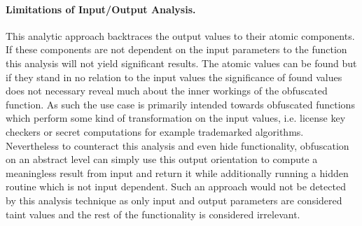 \documentclass[10pt,twoside,a4paper,bibliography=totoc]{scrbook}
\begin{document}
\paragraph*{Limitations of Input/Output Analysis.} This analytic approach backtraces the output values to their atomic components. 
If these components are not dependent on the input parameters to the function this analysis will not yield significant results.
The atomic values can be found but if they stand in no relation to the input values the significance of found values does not necessary reveal much about the inner workings of the obfuscated function.
As such the use case is primarily intended towards obfuscated functions which perform some kind of transformation on the input values, i.e. license key checkers or secret computations for example trademarked algorithms.\\
Nevertheless to counteract this analysis and even hide functionality, obfuscation on an abstract level can simply use this output orientation to compute a meaningless result from input and return it while additionally running a hidden routine which is not input dependent.
Such an approach would not be detected by this analysis technique as only input and output parameters are considered taint values and the rest of the functionality is considered irrelevant.
\end{document}
